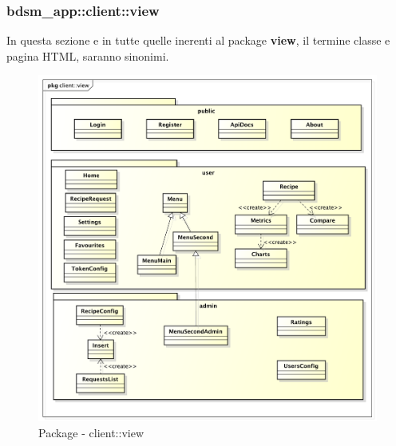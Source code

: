 %


\subsubsection{bdsm\_app::client::view} %
\label{ssub:bdsm_app_client_view}
In questa sezione e in tutte quelle inerenti al package \textbf{view}, il termine classe e pagina HTML, saranno sinonimi.
\begin{figure}[htbp]
	\centering
	\centerline{\includegraphics[scale=0.5]{./images/client/client_view.pdf}}
	\caption{Package - client::view}
\end{figure}

